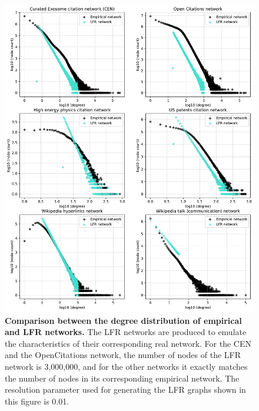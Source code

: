 \documentclass[a4paper]{article}   	%
\begin{document}
\begin{figure}[H]
\centering
\includegraphics[width=0.85\linewidth]{figs/all_degrees.pdf}
\caption[Comparison between the degree distribution of empirical and LFR networks.]{\textbf{Comparison between the degree distribution of empirical and LFR networks.} The LFR networks are produced to emulate the characteristics of their corresponding real network. For the CEN and the OpenCitations network, the number of nodes of the LFR network is 3,000,000, and for the other networks it exactly matches the number of nodes in its corresponding empirical network. The resolution parameter used for generating the LFR graphs shown in this figure is 0.01. }
\label{fig:all-degrees}
\end{figure}
\end{document}
